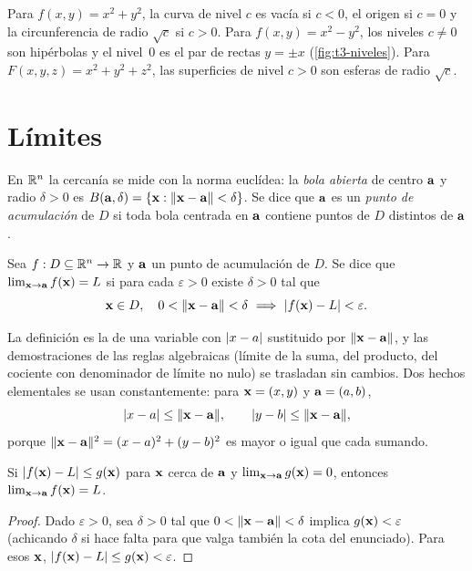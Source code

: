 \begin{ejemplo}\label{ej:t3-niveles}
Para $f(x,y)=x^2+y^2$, la curva de nivel $c$ es vacía si $c<0$, el origen si $c=0$ y la circunferencia de radio $\sqrt c$ si $c>0$. Para $f(x,y)=x^2-y^2$, los niveles $c\neq0$ son hipérbolas y el nivel~0 es el par de rectas $y=\pm x$ (\cref{fig:t3-niveles}). Para $F(x,y,z)=x^2+y^2+z^2$, las superficies de nivel $c>0$ son esferas de radio $\sqrt c$.
\end{ejemplo}

\section{Límites}

En $\mathbb{R}^n$ la cercanía se mide con la norma euclídea: la \emph{bola abierta} de centro $\mathbf{a}$ y radio $\delta>0$ es $B(\mathbf{a},\delta)=\{\mathbf{x}:\lVert\mathbf{x}-\mathbf{a}\rVert<\delta\}$. Se dice que $\mathbf{a}$ es un \emph{punto de acumulación} de $D$ si toda bola centrada en $\mathbf{a}$ contiene puntos de $D$ distintos de $\mathbf{a}$.

\begin{definicion}[Límite]\label{def:limite-n}
Sea $f:D\subseteq\mathbb{R}^n\to\mathbb{R}$ y $\mathbf{a}$ un punto de acumulación de $D$. Se dice que $\lim_{\mathbf{x}\to\mathbf{a}}f(\mathbf{x})=L$ si para cada $\varepsilon>0$ existe $\delta>0$ tal que
\[
\vx\in D,\quad 0<\norm{\vx-\va}<\delta\ \Longrightarrow\ \abs{f(\vx)-L}<\varepsilon .
\]
\end{definicion}

La definición es la de una variable con $\lvert x-a\rvert$ sustituido por $\lVert\mathbf{x}-\mathbf{a}\rVert$, y las demostraciones de las reglas algebraicas (límite de la suma, del producto, del cociente con denominador de límite no nulo) se trasladan sin cambios. Dos hechos elementales se usan constantemente: para $\mathbf{x}=(x,y)$ y $\mathbf{a}=(a,b)$,
\begin{equation}\label{eq:t3-coordenada}
\lvert x-a\rvert\le\lVert\mathbf{x}-\mathbf{a}\rVert,\qquad \lvert y-b\rvert\le\lVert\mathbf{x}-\mathbf{a}\rVert,
\end{equation}
porque $\lVert\mathbf{x}-\mathbf{a}\rVert^2=(x-a)^2+(y-b)^2$ es mayor o igual que cada sumando.

\begin{proposicion}[Acotación]\label{prop:acotacion}
Si $\lvert f(\mathbf{x})-L\rvert\le g(\mathbf{x})$ para $\mathbf{x}$ cerca de $\mathbf{a}$ y $\lim_{\mathbf{x}\to\mathbf{a}}g(\mathbf{x})=0$, entonces $\lim_{\mathbf{x}\to\mathbf{a}}f(\mathbf{x})=L$.
\end{proposicion}

\begin{proof}
Dado $\varepsilon>0$, sea $\delta>0$ tal que $0<\lVert\mathbf{x}-\mathbf{a}\rVert<\delta$ implica $g(\mathbf{x})<\varepsilon$ (achicando $\delta$ si hace falta para que valga también la cota del enunciado). Para esos $\mathbf{x}$, $\lvert f(\mathbf{x})-L\rvert\le g(\mathbf{x})<\varepsilon$.
\end{proof}

